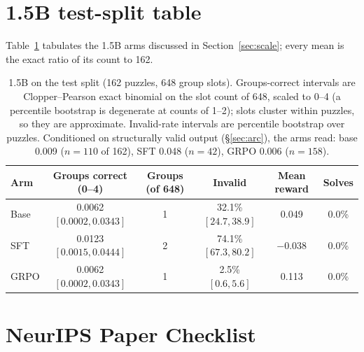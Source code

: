 \documentclass{article}
\begin{document}
\section{1.5B test-split table}
\label{app:small}

Table~\ref{tab:small} tabulates the 1.5B arms discussed in
Section~\ref{sec:scale}; every mean is the exact ratio of its count to 162.

\begin{table}[h]
\centering
\caption{1.5B on the test split (162 puzzles, 648 group slots).
Groups-correct intervals are Clopper--Pearson exact binomial on the slot
count of 648, scaled to 0--4 (a percentile bootstrap is degenerate at counts
of 1--2); slots cluster within puzzles, so they are approximate.
Invalid-rate intervals are percentile bootstrap over puzzles. Conditioned on
structurally valid output (\S\ref{sec:arc}), the arms read: base 0.009
($n=110$ of 162), SFT 0.048 ($n=42$), GRPO 0.006 ($n=158$).}
\label{tab:small}
\small
\setlength{\tabcolsep}{4pt}
\begin{tabular}{lccccc}
\toprule
Arm & Groups correct (0--4) & Groups (of 648) & Invalid & Mean reward & Solves \\
\midrule
Base & 0.0062 $[0.0002, 0.0343]$ & 1 & 32.1\% $[24.7, 38.9]$ & 0.049 & 0.0\% \\
SFT  & 0.0123 $[0.0015, 0.0444]$ & 2 & 74.1\% $[67.3, 80.2]$ & $-0.038$ & 0.0\% \\
GRPO & 0.0062 $[0.0002, 0.0343]$ & 1 & 2.5\% $[0.6, 5.6]$ & 0.113 & 0.0\% \\
\bottomrule
\end{tabular}
\end{table}


\clearpage
\section*{NeurIPS Paper Checklist}
\end{document}
